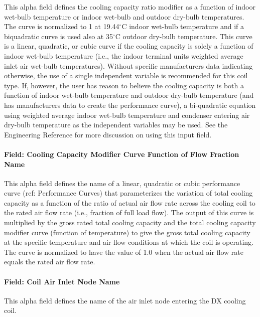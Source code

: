 This alpha field defines the cooling capacity ratio modifier as a function of indoor wet-bulb temperature or indoor wet-bulb and outdoor dry-bulb temperatures. The curve is normalized to 1 at 19.44$^\circ$C indoor wet-bulb temperature and if a biquadratic curve is used also at 35$^\circ$C outdoor dry-bulb temperature. This curve is a linear, quadratic, or cubic curve if the cooling capacity is solely a function of indoor wet-bulb temperature (i.e., the indoor terminal units weighted average inlet air wet-bulb temperatures). Without specific manufacturers data indicating otherwise, the use of a single independent variable is recommended for this coil type. If, however, the user has reason to believe the cooling capacity is both a function of indoor wet-bulb temperature and outdoor dry-bulb temperature (and has manufacturers data to create the performance curve), a bi-quadratic equation using weighted average indoor wet-bulb temperature and condenser entering air dry-bulb temperature as the independent variables may be used. See the Engineering Reference for more discussion on using this input field.

\paragraph{Field: Cooling Capacity Modifier Curve Function of Flow Fraction Name}\label{field-cooling-capacity-modifier-curve-function-of-flow-fraction-name}

This alpha field defines the name of a linear, quadratic or cubic performance curve (ref: Performance Curves) that parameterizes the variation of total cooling capacity as a function of the ratio of actual air flow rate across the cooling coil to the rated air flow rate (i.e., fraction of full load flow). The output of this curve is multiplied by the gross rated total cooling capacity and the total cooling capacity modifier curve (function of temperature) to give the gross total cooling capacity at the specific temperature and air flow conditions at which the coil is operating. The curve is normalized to have the value of 1.0 when the actual air flow rate equals the rated air flow rate.

\paragraph{Field: Coil Air Inlet Node Name}\label{field-coil-air-inlet-node-name}

This alpha field defines the name of the air inlet node entering the DX cooling coil.

